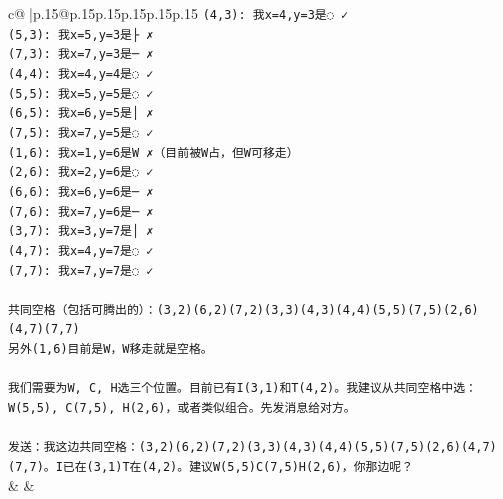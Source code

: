 \documentclass{article}
\begin{document}
{\begin{supertabular}{c@{$\;$}|p{.15\linewidth}@{}p{.15\linewidth}p{.15\linewidth}p{.15\linewidth}p{.15\linewidth}p{.15\linewidth}}
{{{\texttt{(4,3): 我x=4,y=3是◌ ✓} \\
\texttt{(5,3): 我x=5,y=3是├ ✗} \\
\texttt{(7,3): 我x=7,y=3是─ ✗} \\
\texttt{(4,4): 我x=4,y=4是◌ ✓} \\
\texttt{(5,5): 我x=5,y=5是◌ ✓} \\
\texttt{(6,5): 我x=6,y=5是│ ✗} \\
\texttt{(7,5): 我x=7,y=5是◌ ✓} \\
\texttt{(1,6): 我x=1,y=6是W ✗（目前被W占，但W可移走）} \\
\texttt{(2,6): 我x=2,y=6是◌ ✓} \\
\texttt{(6,6): 我x=6,y=6是─ ✗} \\
\texttt{(7,6): 我x=7,y=6是─ ✗} \\
\texttt{(3,7): 我x=3,y=7是│ ✗} \\
\texttt{(4,7): 我x=4,y=7是◌ ✓} \\
\texttt{(7,7): 我x=7,y=7是◌ ✓} \\
\\ 
\texttt{共同空格（包括可腾出的）：(3,2)(6,2)(7,2)(3,3)(4,3)(4,4)(5,5)(7,5)(2,6)(4,7)(7,7)} \\
\texttt{另外(1,6)目前是W，W移走就是空格。} \\
\\ 
\texttt{我们需要为W, C, H选三个位置。目前已有I(3,1)和T(4,2)。我建议从共同空格中选：W(5,5), C(7,5), H(2,6)，或者类似组合。先发消息给对方。} \\
\\ 
\texttt{发送：我这边共同空格：(3,2)(6,2)(7,2)(3,3)(4,3)(4,4)(5,5)(7,5)(2,6)(4,7)(7,7)。I已在(3,1)T在(4,2)。建议W(5,5)C(7,5)H(2,6)，你那边呢？} \\
            }
        }
    }
    & & \\ \\


\end{supertabular}}
\end{document}
